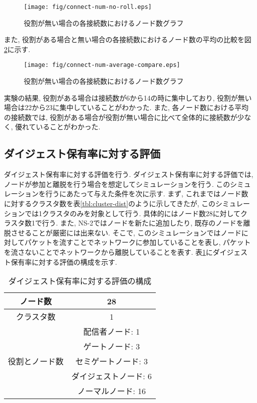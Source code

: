 \newpage

\begin{figure}[h]
  \centering
  \texttt{[image: fig/connect-num-no-roll.eps]}
  \caption{役割が無い場合の各接続数におけるノード数グラフ}
  \label{fig:connect-num-no-roll}
\end{figure}

また, 役割がある場合と無い場合の各接続数におけるノード数の平均の比較を図\ref{fig:connect-num-average-compare}に示す.

\newpage

\begin{figure}[h]
  \centering
  \texttt{[image: fig/connect-num-average-compare.eps]}
  \caption{役割が無い場合の各接続数におけるノード数グラフ}
  \label{fig:connect-num-average-compare}
\end{figure}

実験の結果, 役割がある場合は接続数が6から14の時に集中しており, 役割が無い場合は22から23に集中していることがわかった. また, 各ノード数における平均の接続数では, 役割がある場合が役割が無い場合に比べて全体的に接続数が少なく, 優れていることがわかった.

\subsection{ダイジェスト保有率に対する評価}\label{subsec:eval-digest-have}
ダイジェスト保有率に対する評価を行う. ダイジェスト保有率に対する評価では, ノードが参加と離脱を行う場合を想定してシミュレーションを行う. このシミュレーションを行うにあたって与えた条件を次に示す. まず, これまではノード数に対するクラスタ数を表\ref{tbl:cluster-dist}のように示してきたが, このシミュレーションでは1クラスタのみを対象として行う. 具体的にはノード数28に対してクラスタ数1で行う. また, NS-2ではノードを新たに追加したり, 既存のノードを離脱させることが厳密には出来ない. そこで, このシミュレーションではノードに対してパケットを流すことでネットワークに参加していることを表し, パケットを流さないことでネットワークから離脱していることを表す. 表\ref{tbl:digest-have}にダイジェスト保有率に対する評価の構成を示す.

\begin{table}[h]
  \caption{ダイジェスト保有率に対する評価の構成}
  \label{tbl:digest-have}
  \centering
      {\small
        \begin{tabular}{|c||c|} \hline
        ノード数 & 28 \\ \hline
        クラスタ数 & 1 \\ \hline
        & 配信者ノード: 1 \\ \cline{2-2}
        & ゲートノード: 3 \\ \cline{2-2}
        役割とノード数 & セミゲートノード: 3 \\ \cline{2-2}
        & ダイジェストノード: 6 \\ \cline{2-2}
        & ノーマルノード: 16 \\ \cline{2-2}
        \hline
        \end{tabular}
      }
\end{table}

